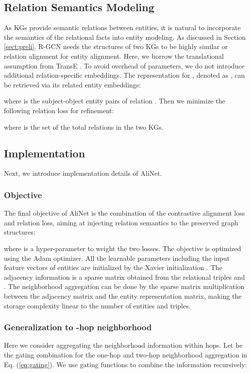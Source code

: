 \documentclass[letterpaper]{article} \usepackage{aaai20}  \usepackage{times}  \usepackage{helvet} \usepackage{courier}  \usepackage[hyphens]{url}  \usepackage{graphicx} \urlstyle{rm} \def\UrlFont{\rm}  \frenchspacing  \setlength{\pdfpagewidth}{8.5in}  \setlength{\pdfpageheight}{11in}  \usepackage{amsmath}
\begin{document}
\subsection{Relation Semantics Modeling}
As KGs provide semantic relations between entities, it is natural to incorporate the semantics of the relational facts into entity modeling. As discussed in Section \ref{sect:preli}, R-GCN needs the structures of two KGs to be highly similar or relation alignment for entity alignment. Here, we borrow the translational assumption from TransE \cite{TransE}. To avoid overhead of parameters, we do not introduce additional relation-specific embeddings. The representation for , denoted as , can be retrieved via its related entity embeddings:

where  is the subject-object entity pairs of relation . Then we minimize the following relation loss for refinement:

where  is the set of the total relations in the two KGs.

\subsection{Implementation}
Next, we introduce implementation details of AliNet.
\subsubsection{Objective}
The final objective of AliNet is the combination of the contrastive alignment loss and relation loss, aiming at injecting relation semantics to the preserved graph structures:

where  is a hyper-parameter to weight the two losses. The objective is optimized using the Adam optimizer. All the learnable parameters including the input feature vectors of entities are initialized by the Xavier initialization \cite{Xavier}. The adjacency information is a sparse matrix obtained from the relational triples  and . The neighborhood aggregation can be done by the sparse matrix multiplication between the adjacency matrix and the entity representation matrix, making the storage complexity linear to the number of entities and triples. 

\subsubsection{Generalization to -hop neighborhood} 
Here we consider aggregating the neighborhood information within  hops. Let  be the gating combination for the one-hop and two-hop neighborhood aggregation in Eq. (\ref{eq:gating}). We use  gating functions to combine the information recursively:
\end{document}
